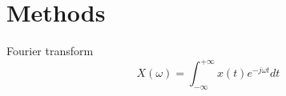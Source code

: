\newpage

\section{Methods}



Fourier transform
\[
    X(\omega) = \int_{-\infty}^{+\infty} x(t)e^{-j\omega t} dt
\]